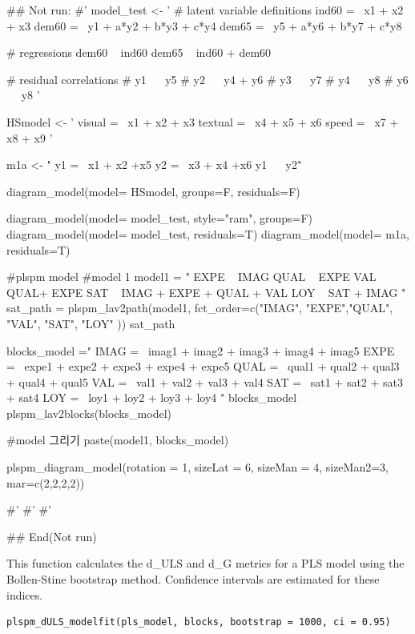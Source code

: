 \documentclass[a4paper]{book}
\begin{document}
\begin{Examples}
\begin{ExampleCode}
\#\# Not run: 
#'
model_test <- '
  # latent variable definitions
     ind60 =~ x1 + x2 + x3
     dem60 =~ y1 + a*y2 + b*y3 + c*y4
     dem65 =~ y5 + a*y6 + b*y7 + c*y8

  # regressions
    dem60 ~ ind60
    dem65 ~ ind60 + dem60

  # residual correlations
    # y1 ~~ y5
    # y2 ~~ y4 + y6
    # y3 ~~ y7
    # y4 ~~ y8
    # y6 ~~ y8
'

HSmodel <- ' visual  =~ x1 + x2 + x3
             textual =~ x4 + x5 + x6
             speed   =~ x7 + x8 + x9 '


m1a <- "
y1 =~ x1 + x2 +x5
y2 =~ x3 + x4 +x6
y1 ~~ y2"

diagram_model(model= HSmodel, groups=F,  residuals=F)

diagram_model(model= model_test, style="ram", groups=F)
diagram_model(model= model_test, residuals=T)
diagram_model(model= m1a, residuals=T)


#plspm model
#model 1
model1 = "
EXPE ~ IMAG
QUAL ~ EXPE
VAL ~  QUAL+ EXPE
SAT ~ IMAG + EXPE + QUAL + VAL
LOY ~ SAT + IMAG
"
sat_path = plspm_lav2path(model1,
                          fct_order=c("IMAG", "EXPE","QUAL", "VAL", "SAT", "LOY" ))
sat_path

blocks_model ="
IMAG =~ imag1 + imag2 + imag3 + imag4 + imag5
EXPE =~ expe1 + expe2 + expe3 + expe4 + expe5
QUAL =~ qual1 + qual2 + qual3 + qual4 + qual5
VAL =~ val1 + val2 + val3 + val4
SAT =~ sat1 + sat2 + sat3 + sat4
LOY =~ loy1 + loy2 + loy3 + loy4
"
blocks_model
plspm_lav2blocks(blocks_model)

#model 그리기
paste(model1, blocks_model)%

  plspm_diagram_model(rotation = 1, sizeLat = 6, sizeMan = 4, sizeMan2=3,
                mar=c(2,2,2,2))

#'
#'
#'

## End(Not run)
\end{ExampleCode}
\end{Examples}
%
\begin{Description}
This function calculates the d\_ULS and d\_G metrics for a PLS model using the Bollen-Stine bootstrap method.
Confidence intervals are estimated for these indices.
\end{Description}
%
\begin{Usage}
\begin{verbatim}
plspm_dULS_modelfit(pls_model, blocks, bootstrap = 1000, ci = 0.95)
\end{verbatim}
\end{Usage}
\end{document}
